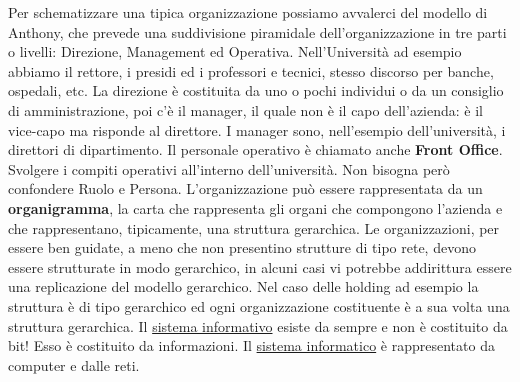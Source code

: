 Per schematizzare una tipica organizzazione possiamo avvalerci del modello di Anthony, che prevede una suddivisione piramidale dell'organizzazione in tre parti o livelli: Direzione, Management ed Operativa. Nell'Università ad esempio abbiamo il rettore, i presidi ed i professori e tecnici, stesso discorso per banche, ospedali, etc. La direzione è costituita da uno o pochi individui o da un consiglio di amministrazione, poi c'è il manager, il quale non è il capo dell'azienda: è il vice-capo ma risponde al direttore. I manager sono, nell’esempio dell’università, i direttori di dipartimento. Il personale operativo è chiamato anche \textbf{Front Office}. Svolgere i compiti operativi all'interno dell'università. Non bisogna però confondere Ruolo e Persona. L'organizzazione può essere rappresentata da un \textbf{organigramma}, la carta che rappresenta gli organi che compongono l'azienda e che rappresentano, tipicamente, una struttura gerarchica. Le organizzazioni, per essere ben guidate, a meno che non presentino strutture di tipo rete, devono essere strutturate in modo gerarchico, in alcuni casi vi potrebbe addirittura essere una replicazione del modello gerarchico. Nel caso delle holding ad esempio la struttura è di tipo gerarchico ed ogni organizzazione costituente è a sua volta una struttura gerarchica. Il \underline{sistema informativo} esiste da sempre e non è costituito da bit! Esso è costituito da informazioni. Il \underline{sistema informatico} è rappresentato da computer e dalle reti. 
 
